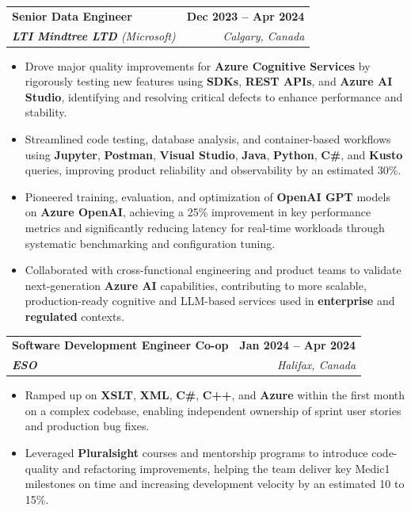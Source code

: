 \documentclass[letterpaper,11pt]{article}
\makeatletter
\newcommand{\resumeItem}[1]{
  \item\small{
    {#1 \vspace{-2pt}}
  }
}
\newcommand{\resumeSubheading}[4]{
  \vspace{-2pt}\item
    \begin{tabular*}{1.0\textwidth}[t]{l@{\extracolsep{\fill}}r}
      \textbf{#1} & \textbf{\small #2} \\
      \textit{\small#3} & \textit{\small #4} \\
    \end{tabular*}\vspace{-7pt}
}
\newcommand{\resumeItemListStart}{\begin{itemize}}
\newcommand{\resumeItemListEnd}{\end{itemize}\vspace{-5pt}}
\makeatother
\begin{document}
    \resumeSubheading
      {\textbf{Senior Data Engineer}}{\textbf{Dec 2023 -- Apr 2024}}
      {\textbf{LTI Mindtree LTD} (Microsoft)}{Calgary, Canada}
      \resumeItemListStart
        \resumeItem{Drove major quality improvements for \textbf{Azure Cognitive Services} by rigorously testing new features using \textbf{SDKs}, \textbf{REST APIs}, and \textbf{Azure AI Studio}, identifying and resolving critical defects to enhance performance and stability.}
        \resumeItem{Streamlined code testing, database analysis, and container-based workflows using \textbf{Jupyter}, \textbf{Postman}, \textbf{Visual Studio}, \textbf{Java}, \textbf{Python}, \textbf{C\#}, and \textbf{Kusto} queries, improving product reliability and observability by an estimated 30\%.}
        \resumeItem{Pioneered training, evaluation, and optimization of \textbf{OpenAI GPT} models on \textbf{Azure OpenAI}, achieving a 25\% improvement in key performance metrics and significantly reducing latency for real-time workloads through systematic benchmarking and configuration tuning.}
        \resumeItem{Collaborated with cross-functional engineering and product teams to validate next-generation \textbf{Azure AI} capabilities, contributing to more scalable, production-ready cognitive and LLM-based services used in \textbf{enterprise} and \textbf{regulated} contexts.}
      \resumeItemListEnd
    
    \resumeSubheading
      {\textbf{Software Development Engineer Co-op}}{\textbf{Jan 2024 -- Apr 2024}}
      {\textbf{ESO}}{Halifax, Canada}
      \resumeItemListStart
        \resumeItem{Ramped up on \textbf{XSLT}, \textbf{XML}, \textbf{C\#}, \textbf{C++}, and \textbf{Azure} within the first month on a complex codebase, enabling independent ownership of sprint user stories and production bug fixes.}
        \resumeItem{Leveraged \textbf{Pluralsight} courses and mentorship programs to introduce code-quality and refactoring improvements, helping the team deliver key Medic1 milestones on time and increasing development velocity by an estimated 10 to 15\%.}
      \resumeItemListEnd
\end{document}
